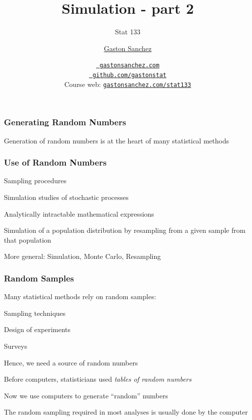 \documentclass[12pt]{beamer}\usepackage[]{graphicx}\usepackage[]{color}
\title{Simulation - part 2}
\subtitle{Stat 133}
\author{\href{http://www.gastonsanchez.com}{Gaston Sanchez}}
\institute{Department of Statistics, UC{\textendash}Berkeley}
\date{\href{http://www.gastonsanchez.com}{\tt \scriptsize \color{foreground} gastonsanchez.com}
\\[-4pt]
\href{http://github.com/gastonstat}{\tt \scriptsize \color{foreground} github.com/gastonstat}
\\[-4pt]
{\scriptsize Course web: \href{http://www.gastonsanchez.com/stat133}{\tt gastonsanchez.com/stat133}}
}
\begin{document}
{
  \frame{
    \titlepage
  } 
}


\begin{frame}
\begin{center}
\Huge{}
\end{center}
\end{frame}


\begin{frame}
\frametitle{Generating Random Numbers}

\Large Generation of random numbers is at the heart of many statistical methods

\end{frame}


\begin{frame}
\frametitle{Use of Random Numbers}

\bbi
  \item Sampling procedures
  \item Simulation studies of stochastic processes
  \item Analytically intractable mathematical expressions
  \item Simulation of a population distribution by resampling from a given sample from that population
  \item More general: Simulation, Monte Carlo, Resampling
\ei
\eb

\end{frame}


\begin{frame}
\frametitle{Random Samples}

\bi
  \item Many statistical methods rely on random samples:
  \bi
    \item Sampling techniques
    \item Design of experiments
    \item Surveys
  \ei
  \item Hence, we need a source of random numbers
  \item Before computers, statisticians used \textit{tables of random numbers}
  \item Now we use computers to generate ``random'' numbers
  \item The random sampling required in most analyses is usually done by the computer
\ei

\end{frame}
\end{document}
